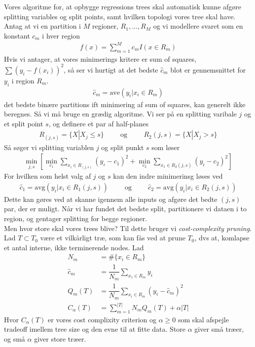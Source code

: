 \documentclass[paper=a4, fontsize=11pt]{scrartcl} %
\numberwithin{equation}{section} %
\numberwithin{figure}{section} %
\numberwithin{table}{section} %
\begin{document}
	Vores algoritme for, at opbygge regressions trees skal automatisk kunne afgøre splitting variables og split points, samt hvilken topologi vores tree skal have. Antag at vi en partition i $M$ regioner, $R_1,...,R_M$ og vi modellere svaret som en konstant $c_m$ i hver region
	\begin{align*}
	f(x)=\sum_{m=1}^{M}c_mI(x\in R_m)
	\end{align*}
	Hvis vi antager, at vores minimerings kritere er sum of squares, $\sum(y_i-f(x_i))^2$, så ser vi hurtigt at det bedste $\hat{c}_m$ blot er gennemsnittet for $y_i$ i region $R_m$.
	\begin{align*}
	\hat{c}_m=\text{ave}(y_i|x_i\in R_m)
	\end{align*}
	det bedste binære partitions ift minimering af sum of squares, kan generelt ikke beregnes. Så vi må bruge en grædig algoritme. Vi ser på en splitting varibale $j$ og et split point $s$, og definere et par af half-planes
	\begin{align*}
	R_(j,s)=\{X|X_j\leq s\} \hspace{1cm} \text{og} \hspace{1cm} R_2(j,s)=\{X|X_j>s\}
	\end{align*}
	Så søger vi splitting variablen $j$ og split punkt $s$ som løser
	\begin{align*}
	\underset{j,s}{\min}\left[\underset{c_1}{\min}\sum_{x_i\in R_(j,s)}(y_i-c_1)^2+\underset{c_2}{\min}\sum_{x_1\in R_2(j,s)}(y_i-c_2)^2\right]
	\end{align*}
	For hvilken som helst valg af $j$ og $s$ kan den indre minimerinsg løses ved 
	\begin{align*}
	\hat{c}_1=\text{avg}(y_i|x_i\in R_1(j,s))\hspace{1cm}\text{og}\hspace{1cm}\hat{c}_2=\text{avg}(y_i|x_i\in R_2(j,s))
	\end{align*}
	Dette kan gøres ved at skanne igennem alle inputs og afgøre det bedte $(j,s)$ par, der er muligt. Når vi har fundet det bedste split, partitionere vi dataen i to region, og gentager splitting for begge regioner. \\
	
	Men hvor store skal vores trees blive? Til dette bruger vi \textit{cost-complexity pruning}. Lad $T\subset T_0$ være et vilkårligt træ, som kan fås ved at prune $T_0$, dvs at, komlapse et antal interne, ikke terminerende nodes. Lad
	\begin{align*}
	N_m&=\#\{x_i\in R_m\} \\
	\hat{c}_m&=\dfrac{1}{N_m}\sum_{x_1\in R_m}y_i \\
	Q_m(T)&=\dfrac{1}{N_m}\sum_{x_i\in R_m}(y_i-\hat{c}_m)^2 \\
	C_\alpha(T)&=\sum_{m=1}^{|T|}N_mQ_m(T)+\alpha|T|
	\end{align*}
	Hvor $C_\alpha(T)$ er vores cost complixity criterion og $\alpha\geq0$ som skal afspejle tradeoff imellem tree size og den evne til at fitte data. Store $\alpha$ giver små træer, og små $\alpha$ giver store træer. \\
	
\end{document}
